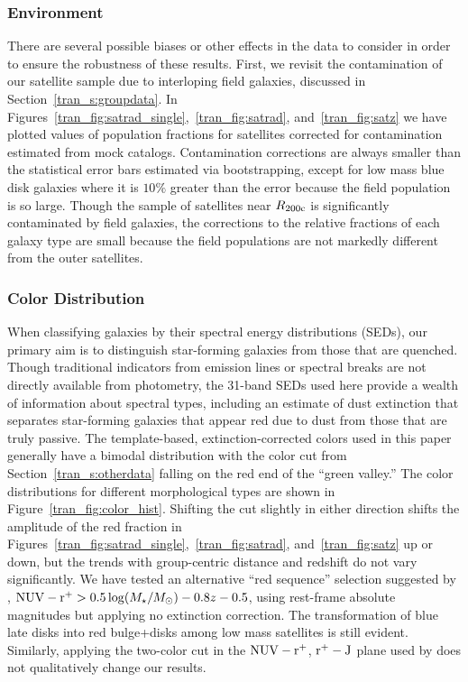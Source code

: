 \subsubsection{Environment}

There are several possible biases or other effects in the data to
consider in order to ensure the robustness of these results. First, we
revisit the contamination of our satellite sample due to interloping
field galaxies, discussed in Section~\ref{tran_s:groupdata}. In
Figures~\ref{tran_fig:satrad_single},~\ref{tran_fig:satrad}, and~\ref{tran_fig:satz} we
have plotted values of population fractions for satellites corrected for contamination estimated
from mock catalogs. Contamination corrections are always smaller
than the statistical error bars estimated via bootstrapping, except
for low mass blue disk galaxies where it is $10\%$ greater than the
error because the field population is so large. Though the sample of satellites near $R_{\rm 200c}$ is
significantly contaminated by field galaxies, the corrections to the
relative fractions of each galaxy type are small because the field
populations are not markedly different from the outer satellites.

\subsubsection{Color Distribution}

When classifying galaxies by their spectral energy distributions (SEDs), our primary aim
is to distinguish star-forming galaxies from those that are
quenched. Though traditional indicators from emission lines or
spectral breaks are not directly available from photometry, the 31-band SEDs
used here provide a wealth of information about spectral types,
including an estimate of dust extinction that separates star-forming
galaxies that appear red due to dust from those that are truly
passive. The template-based, extinction-corrected \nuvr colors used in
this paper generally have a bimodal distribution with the color cut
from Section~\ref{tran_s:otherdata} falling on the red end of the ``green
valley.'' The color distributions for different morphological types
are shown in Figure~\ref{tran_fig:color_hist}. Shifting the cut slightly in
either direction shifts the amplitude of the red fraction in
Figures~\ref{tran_fig:satrad_single},~\ref{tran_fig:satrad}, and~\ref{tran_fig:satz}
up or down, but the trends with group-centric distance and redshift do
not vary significantly. We have tested an alternative ``red sequence''
selection suggested by \citet{Ilbert2010}, ${\rm NUV - r^+} >
0.5\log(M_{\star}/M_{\odot}) - 0.8 z - 0.5$, using rest-frame absolute
magnitudes but applying no extinction correction. The transformation
of blue late disks into red bulge+disks among low mass satellites is
still evident. Similarly, applying the two-color cut in the ${\rm NUV
  - r^+}$, ${\rm r^+ - J}$ plane used by \citet{Bundy2010} does not
qualitatively change our results.

